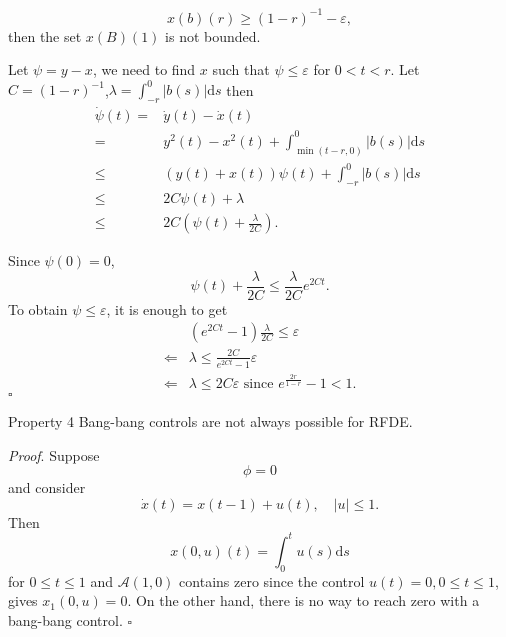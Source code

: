 \begin{frame}[t]
     \[
       x(b)(r)\ge(1-r)^{-1}-\varepsilon ,
    \] 
    then the set $x(B)(1)$ is  not bounded.

    Let $\psi =y-x$, we need to find $x$ such that  $\psi\le \varepsilon $ for $0< t < r$. Let $C=(1-r)^{-1}$,$\lambda=\int_{-r}^{0}|b(s)|\mathrm{d}s$ then
    \begin{align*}
      \dot{\psi}(t)=&\dot{y}(t)-\dot{x}(t)\\
      =&y^2(t)-x^2(t)+\int_{\min(t-r,0)}^{0}|b(s)|\mathrm{d}s\\
      \le & \left( y(t)+x(t) \right) \psi(t)+\int_{-r}^{0}|b(s)|\mathrm{d}s\\
      \le & 2 C \psi(t)+\lambda\\
      \le & 2C\left( \psi(t)+\frac{\lambda}{2C} \right) 
    .\end{align*}
\end{frame}

\begin{frame}[t]
  Since $\psi(0)=0$,
  \[
    \psi(t)+\frac{\lambda}{2C}\le \frac{\lambda}{2C} e^{2Ct}.
  \] 
  To obtain $\psi\le \varepsilon $, it is enough to get 
  \begin{align*}
    &(e^{2Ct}-1)\frac{\lambda}{2C}\le \varepsilon \\
    \Leftarrow & \lambda \le  \frac{2C}{e^{2Ct}-1}\varepsilon \\
    \Leftarrow & \lambda\le 2C\varepsilon  \text{ since }e^{ \frac{2r}{1-r}}-1 <1.
  \end{align*}\hfill $\square$\par
\end{frame}

\begin{frame}[t]
  \begin{alertblock}{Property 4}
    Bang-bang controls are not always possible for RFDE.
  \end{alertblock}
  {\noindent\itshape Proof}.
  Suppose 
  \[
  \phi=0
  \] and consider 
  \begin{equation}
    \dot{x}(t)=x(t-1)+u(t),\quad |u|\le 1.
  \end{equation}
  Then 
  \[
    x(0,u)(t)=\int_0^{t}u(s)\mathrm{d}s 
  \] 
  for $0\le t\le 1$ and  $\mathcal{A}(1,0)$ contains zero since the control $u(t)=0,0\le t\le 1$, gives  $x_1(0,u)=0$. On the other hand, there is no way to reach zero with a bang-bang control.
  \hfill $\square$\par
\end{frame}

